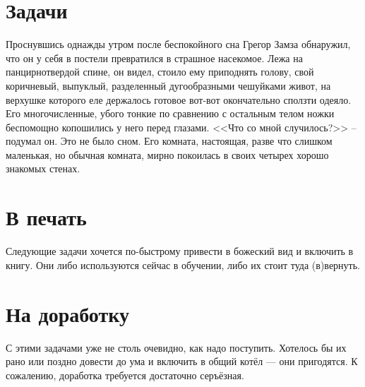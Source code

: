 \chapter{Задачи}

Проснувшись однажды утром после беспокойного сна Грегор Замза обнаружил, что
он у себя в постели превратился в страшное насекомое. Лежа на панцирнотвердой
спине, он видел, стоило ему приподнять голову, свой коричневый, выпуклый,
разделенный дугообразными чешуйками живот, на верхушке которого еле держалось
готовое вот-вот окончательно сползти одеяло. Его многочисленные, убого тонкие
по сравнению с остальным телом ножки беспомощно копошились у него перед
глазами. <<Что со мной случилось?>> -- подумал он. Это не было сном. Его комната,
настоящая, разве что слишком маленькая, но обычная комната, мирно покоилась в
своих четырех хорошо знакомых стенах.








\chapter{В печать}

Следующие задачи хочется по-быстрому привести в божеский вид и включить в
книгу. Они либо используются сейчас в обучении, либо их стоит туда (в)вернуть.












\chapter{На доработку}

С этими задачами уже не столь очевидно, как надо поступить. Хотелось бы их
рано или поздно довести до ума и включить в общий котёл --- они пригодятся.
К сожалению, доработка требуется достаточно серъёзная.

